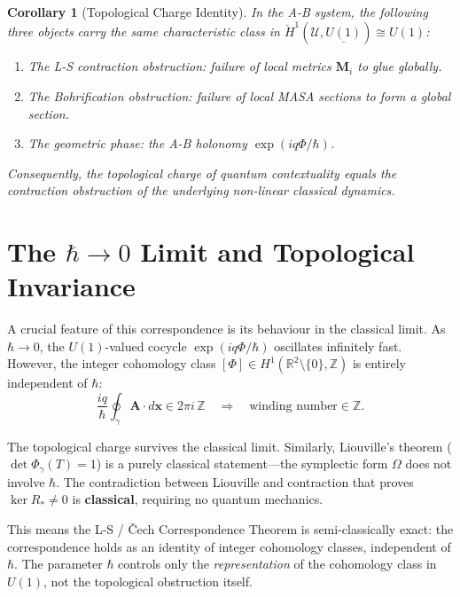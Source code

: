 \documentclass[11pt]{article}
\newtheorem{corollary}[theorem]{Corollary}
\begin{document}
\begin{corollary}[Topological Charge Identity]
\label{cor:charge}
In the A-B system, the following three objects carry the same characteristic class
in $\check{H}^1(\mathcal{U}, \underline{U(1)}) \cong U(1)$:
\begin{enumerate}
  \item The L-S contraction obstruction: failure of local metrics $\mathbf{M}_i$ to glue globally.
  \item The Bohrification obstruction: failure of local MASA sections to form a global section.
  \item The geometric phase: the A-B holonomy $\exp(iq\Phi/\hbar)$.
\end{enumerate}
Consequently, the topological charge of quantum contextuality equals the contraction
obstruction of the underlying non-linear classical dynamics.
\end{corollary}

\section{The $\hbar \to 0$ Limit and Topological Invariance}
\label{sec:hbar}

A crucial feature of this correspondence is its behaviour in the classical limit.
As $\hbar \to 0$, the $U(1)$-valued cocycle $\exp(iq\Phi/\hbar)$ oscillates
infinitely fast. However, the integer cohomology class
$[\Phi] \in H^1(\mathbb{R}^2\setminus\{0\}, \mathbb{Z})$ is entirely independent
of $\hbar$:
\[
\frac{iq}{\hbar} \oint_\gamma \mathbf{A} \cdot d\mathbf{x} \in 2\pi i \,\mathbb{Z}
\quad\Longrightarrow\quad \text{winding number} \in \mathbb{Z}.
\]

The topological charge survives the classical limit. Similarly, Liouville's theorem
($\det\Phi_\gamma(T) = 1$) is a purely classical statement---the symplectic form
$\Omega$ does not involve $\hbar$. The contradiction between Liouville and
contraction that proves $\ker R_* \neq 0$ is \textbf{classical}, requiring no
quantum mechanics.

This means the L-S / \v{C}ech Correspondence Theorem is semi-classically exact:
the correspondence holds as an identity of integer cohomology classes, independent
of $\hbar$. The parameter $\hbar$ controls only the \emph{representation} of the
cohomology class in $U(1)$, not the topological obstruction itself.
\end{document}
